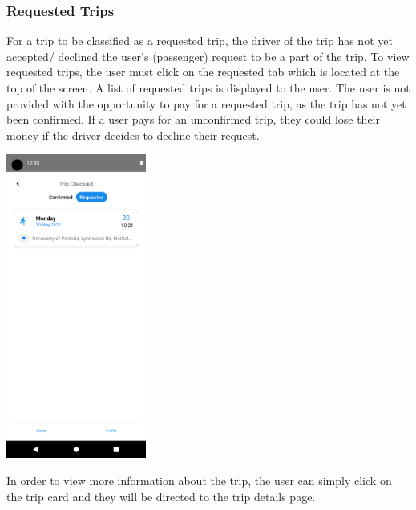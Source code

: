 \documentclass[hidelinks, 12pt, a4paper]{article}
\begin{document}
\subsubsection{Requested Trips}
For a trip to be classified as a requested trip, the driver of the trip has not yet accepted/ declined the user’s (passenger) request to be a part of the trip. To view requested trips, the user must click on the requested tab which is located at the top of the screen. A list of requested trips is displayed to the user. The user is not provided with the opportunity to pay for a requested trip, as the trip has not yet been confirmed. If a user pays for an unconfirmed trip, they could lose their money if the driver decides to decline their request.
\begin{center}
  \includegraphics[height=10cm]{images/requested.png}
\end{center}
\vspace{1cm}
In order to view more information about the trip, the user can simply click on the trip card and they will be directed to the trip details page.
\end{document}
